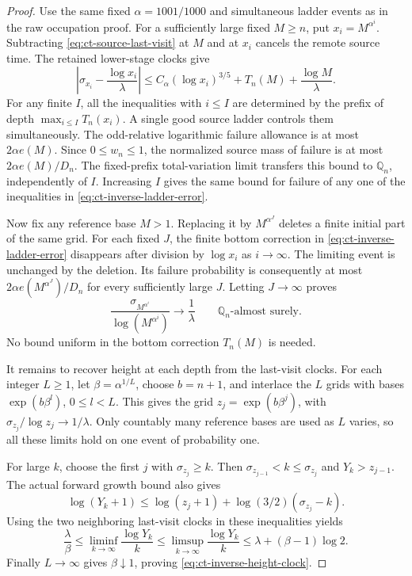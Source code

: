 \documentclass[11pt,a4paper]{article}
\begin{document}
\begin{proof}
Use the same fixed \(\alpha=1001/1000\) and simultaneous ladder
events as in the raw occupation proof. For a sufficiently large fixed
\(M\ge n\), put \(x_i=M^{\alpha^i}\). Subtracting
\eqref{eq:ct-source-last-visit} at \(M\) and at \(x_i\)
cancels the remote source time. The retained lower-stage clocks give
\begin{equation}\label{eq:ct-inverse-ladder-error}
 \left|\sigma_{x_i}-\frac{\log x_i}{\lambda}\right|
 \le C_\alpha(\log x_i)^{3/5}
                +T_n(M)+\frac{\log M}{\lambda}.
\end{equation}
For any finite \(I\), all the inequalities with \(i\le I\)
are determined by the prefix of depth
\(\max_{i\le I}T_n(x_i)\). A single good source ladder controls
them simultaneously. The odd-relative logarithmic failure allowance
is at most \(2\alpha e(M)\). Since \(0\le w_n\le1\),
the normalized source mass of failure is at most
\(2\alpha e(M)/D_n\). The fixed-prefix total-variation limit
transfers this bound to \(\mathbb Q_n\), independently of \(I\).
Increasing \(I\) gives the same bound for failure of any one of
the inequalities in \eqref{eq:ct-inverse-ladder-error}.

Now fix any reference base \(M>1\). Replacing it by
\(M^{\alpha^J}\) deletes a finite initial part of the same grid.
For each fixed \(J\), the finite bottom correction in
\eqref{eq:ct-inverse-ladder-error} disappears after division by
\(\log x_i\) as \(i\to\infty\). The limiting event is
unchanged by the deletion. Its failure probability is consequently
at most \(2\alpha e(M^{\alpha^J})/D_n\) for every sufficiently
large \(J\). Letting \(J\to\infty\) proves
\begin{equation}\label{eq:ct-inverse-reference-clock}
 \frac{\sigma_{M^{\alpha^i}}}{\log(M^{\alpha^i})}
                  \longrightarrow\frac1\lambda
                  \qquad\mathbb Q_n\text{-almost surely}.
\end{equation}
No bound uniform in the bottom correction \(T_n(M)\) is needed.

It remains to recover height at each depth from the last-visit clocks.
For each integer \(L\ge1\), let \(\beta=\alpha^{1/L}\),
choose \(b=n+1\), and interlace the \(L\) grids with bases
\(\exp(b\beta^l)\), \(0\le l<L\). This gives the grid
\(z_j=\exp(b\beta^j)\), with
\(\sigma_{z_j}/\log z_j\to1/\lambda\). Only countably
many reference bases are used as \(L\) varies, so all these
limits hold on one event of probability one.

For large \(k\), choose the first \(j\) with
\(\sigma_{z_j}\ge k\). Then
\(\sigma_{z_{j-1}}<k\le\sigma_{z_j}\) and
\(Y_k>z_{j-1}\). The actual forward growth bound also gives
\[
 \log(Y_k+1)\le\log(z_j+1)
           +\log(3/2)(\sigma_{z_j}-k).
\]
Using the two neighboring last-visit clocks in these inequalities
yields
\[
 \frac\lambda\beta
 \le\liminf_{k\to\infty}\frac{\log Y_k}{k}
 \le\limsup_{k\to\infty}\frac{\log Y_k}{k}
 \le\lambda+(\beta-1)\log2.
\]
Finally \(L\to\infty\) gives \(\beta\downarrow1\), proving
\eqref{eq:ct-inverse-height-clock}.
\end{proof}
\end{document}
